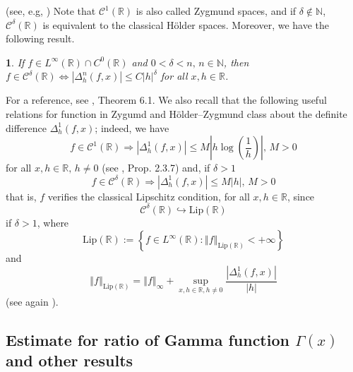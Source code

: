 \documentclass[10pt,a4paper]{amsart}
\numberwithin{equation}{section}
\numberwithin{figure}{section}
\newtheorem{thm}{\protect\theoremname}
\providecommand{\theoremname}{Theorem}
\begin{document}
(see, e.g, \cite{R2022}) Note that $\mathcal{C}^{1}\left(\mathbb{R}\right)$
is also called Zygmund spaces, and if $\delta\notin\mathbb{N}$, $\mathcal{C}^{\delta}\left(\mathbb{R}\right)$
is equivalent to the classical H\"older spaces. Moreover, we have
the following result.
\begin{thm}
\label{thm:finitediff bound}If $f\in L^{\infty}\left(\mathbb{R}\right)\cap C^{0}\left(\mathbb{R}\right)$
and $0<\delta<n,\,n\in\mathbb{N}$, then $f\in\mathcal{C}^{\delta}\left(\mathbb{R}\right)\Leftrightarrow\left|\Delta_{h}^{n}\left(f,x\right)\right|\leq C\left|h\right|^{\delta}$
for all $x,h\in\mathbb{R}$.
\end{thm}

For a reference, see \cite{K1983}, Theorem 6.1. We also recall that
the following useful relations for function in Zygumd and H\"older--Zygmund
class about the definite difference $\Delta_{h}^{1}\left(f,x\right)$;
indeed, we have
\begin{equation}
f\in\mathcal{C}^{1}\left(\mathbb{R}\right)\Rightarrow\left|\Delta_{h}^{1}\left(f,x\right)\right|\leq M\left|h\log\left(\frac{1}{h}\right)\right|,\,M>0\label{eq:LogLip}
\end{equation}
for all $x,h\in\mathbb{R},\,h\neq0$ (see \cite{C1995}, Prop. 2.3.7)
and, if $\delta>1$
\[
f\in\mathcal{C}^{\delta}\left(\mathbb{R}\right)\Rightarrow\left|\Delta_{h}^{1}\left(f,x\right)\right|\leq M\left|h\right|,\,M>0
\]
that is, $f$ verifies the classical Lipschitz condition, for all
$x,h\in\mathbb{R}$, since
\[
\mathcal{C}^{\delta}\left(\mathbb{R}\right)\hookrightarrow\text{Lip}\left(\mathbb{R}\right)
\]
if $\delta>1$, where 
\[
\text{Lip}\left(\mathbb{R}\right):=\left\{ f\in L^{\infty}\left(\mathbb{R}\right):\left\Vert f\right\Vert _{\text{Lip}\left(\mathbb{R}\right)}<+\infty\right\} 
\]
and
\[
\left\Vert f\right\Vert _{\text{Lip}\left(\mathbb{R}\right)}=\left\Vert f\right\Vert _{\infty}+\sup_{x,h\in\mathbb{R},h\neq0}\frac{\left|\Delta_{h}^{1}\left(f,x\right)\right|}{\left|h\right|}
\]
(see again \cite{R2022}). 

\subsection{Estimate for ratio of Gamma function $\Gamma(x)$ and other results}
\end{document}
